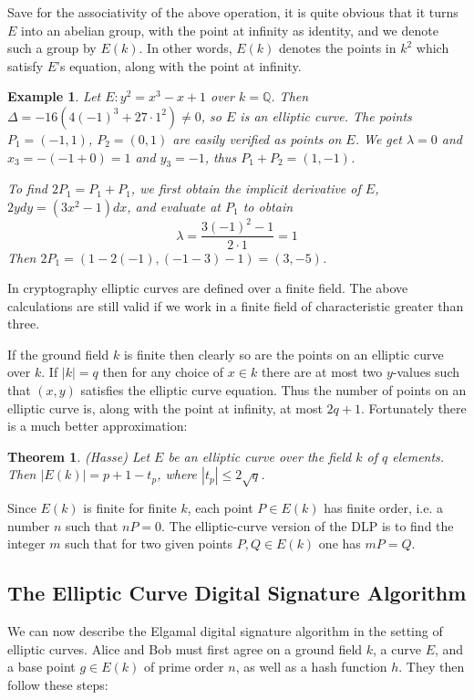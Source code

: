 \documentclass[a4paper,12pt]{article}
\newtheorem*{example}{Example}
\newtheorem*{thm}{Theorem}
\begin{document}
Save for the associativity of the above operation, it is quite obvious that it turns $E$ into an abelian group, with the point at infinity as identity, and we denote such a group by $E(k)$. \cite[p. 51]{silverman} In other words, $E(k)$ denotes the points in $k^2$ which satisfy $E$'s equation, along with the point at infinity.

\begin{example}
Let $E : y^2 = x^3-x+1$ over $k=\mathbb{Q}$. Then $\Delta = -16(4(-1)^3+27\cdot 1^2) \neq 0$, so $E$ is an elliptic curve. The points $P_1 = (-1,1)$, $P_2 = (0,1)$ are easily verified as points on $E$. We get $\lambda = 0$ and $x_3 = -(-1+0) = 1$ and $y_3 = -1$, thus $P_1+P_2 = (1,-1)$.

To find $2P_1 = P_1+P_1$, we first obtain the implicit derivative of $E$, $2y dy = (3x^2-1)dx$, and evaluate at $P_1$ to obtain $$\lambda = \frac{3(-1)^2-1}{2\cdot 1} = 1$$ Then $2P_1 = (1-2(-1), (-1-3)-1) = (3,-5)$.
\end{example}

In cryptography elliptic curves are defined over a finite field. The above calculations are still valid if we work in a finite field of characteristic greater than three.

If the ground field $k$ is finite then clearly so are the points on an elliptic curve over $k$. If $|k|=q$ then for any choice of $x \in k$ there are at most two $y$-values such that $(x,y)$ satisfies the elliptic curve equation. Thus the number of points on an elliptic curve is, along with the point at infinity, at most $2q+1$. Fortunately there is a much better approximation: \cite[p. 289]{hoffstein}

\begin{thm}
(Hasse) Let $E$ be an elliptic curve over the field $k$ of $q$ elements. Then $|E(k)| = p+1-t_p$, where $|t_p| \leq 2 \sqrt{q}$.
\end{thm}

Since $E(k)$ is finite for finite $k$, each point $P \in E(k)$ has finite order, i.e. a number $n$ such that $nP = 0$. The elliptic-curve version of the DLP is to find the integer $m$ such that for two given points $P,Q \in E(k)$ one has $mP = Q$.

\subsection{The Elliptic Curve Digital Signature Algorithm}

We can now describe the Elgamal digital signature algorithm in the setting of elliptic curves. Alice and Bob must first agree on a ground field $k$, a curve $E$, and a base point $g \in E(k)$ of prime order $n$, as well as a hash function $h$. They then follow these steps: \cite[p. 135]{koblitz}
\end{document}
